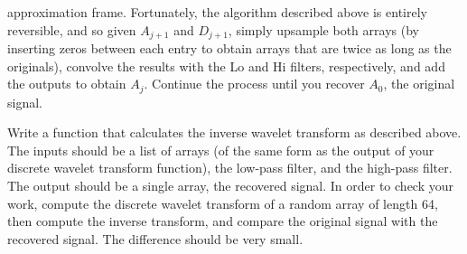 approximation frame. Fortunately, the algorithm described above is entirely reversible,
and so given $A_{j+1}$ and $D_{j+1}$, simply upsample both arrays (by inserting zeros between
each entry to obtain arrays that are twice as long as the originals), convolve the results
with the Lo and Hi filters, respectively, and add the outputs to obtain $A_j$. Continue the 
process until you recover $A_0$, the original signal. 
\begin{problem}
Write a function that calculates the inverse wavelet transform as described above. 
The inputs should be a list of arrays (of the same form as the output of your discrete
wavelet transform function), the low-pass filter, and the high-pass filter. The output 
should be a single array, the recovered signal. In order to check your work, compute
the discrete wavelet transform of a random array of length 64, then compute the inverse
transform, and compare the original signal with the recovered signal. The difference
should be very small.
\end{problem}